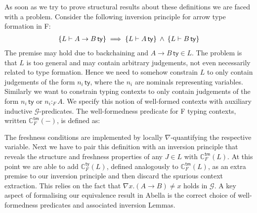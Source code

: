 \documentclass[a4paper,UKenglish]{lipics-v2016}
\newcommand{\ms}{\,}
\newcommand{\mrel}[1]{\mathrel{\ms #1 \ms}}
\newcommand{\mAnd}{\mrel{\wedge}}
\newcommand{\ty}{\mathsf{ty}}
\newcommand{\tm}{\mathsf{tm}}
\newcommand{\istyFh}[1]{\ensuremath{#1\ms\mathsf{ty}}}
\newcommand{\typingFh}[2]{\ensuremath{#1 \mathbin{:_{F}} #2}}
\newcommand{\emptyctx}{\ensuremath{\bullet}}
\theoremstyle{plain}
\begin{document}
\newcommand{\ac}[3]{\ensuremath{\mathbb{C}_{#1}^{#2} (#3)}}
\newcommand{\acFty}[1]{\ac{F}{\ty}{#1}}
\newcommand{\acFtm}[1]{\ac{F}{\tm}{#1}}
As soon as we try to prove structural results about these definitions we are faced with a problem.
Consider the following inversion principle for arrow type formation in F:
\begin{align*}
  \aj{L}{\istyFh{A \to B}} \implies \aj{L}{\istyFh{A}} \mAnd \aj{L}{\istyFh{B}}
\end{align*}
The premise may hold due to backchaining and $\istyFh{A \to B} \in L$.
The problem is that $L$ is too general and may contain arbitrary judgements, not even necessarily related to type formation.
Hence we need to somehow constrain $L$ to only contain judgements of the form $\istyFh{n_i}$, where the $n_i$ are nominals representing variables.
Similarly we want to constrain typing contexts to only contain judgements of the form $\istyFh{n_i}$ or $\typingFh{n_i}{A}$.
We specify this notion of well-formed contexts  with auxiliary inductive $\mathcal{G}$-predicates.
The well-formedness predicate for F typing contexts, written $\acFtm{-}$, is defined as:
{\small
{}
}
The freshness conditions are implemented by locally $\nabla$-quantifying the respective variable.
Next we have to pair this definition with an inversion principle that reveals the structure and freshness properties of any $J \in L$ with $\acFtm{L}$.
At this point we are able to add $\acFty{L}$, defined analogously to $\acFtm{L}$, as an extra premise to our inversion principle and then discard the spurious context extraction.
This relies on the fact that $\nabla x . (A \to B) \neq x$ holds in $\mathcal{G}$.
A key aspect of formalising our equivalence result in Abella is the correct choice of well-formedness predicates and associated inversion Lemmas.
\end{document}
